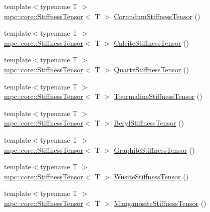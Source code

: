 \begin{DoxyCompactItemize}
\item 
{\footnotesize template$<$typename T $>$ }\\\mbox{\hyperlink{structmpc_1_1core_1_1_stiffness_tensor}{mpc\+::core\+::\+Stiffness\+Tensor}}$<$ T $>$ \mbox{\hyperlink{namespacempc_1_1data_a140a8fa7fc4964a20a6887ba6be7a650}{Corundum\+Stiffness\+Tensor}} ()
\item 
{\footnotesize template$<$typename T $>$ }\\\mbox{\hyperlink{structmpc_1_1core_1_1_stiffness_tensor}{mpc\+::core\+::\+Stiffness\+Tensor}}$<$ T $>$ \mbox{\hyperlink{namespacempc_1_1data_aa3d5b13f695a164174e1cf4b8b074605}{Calcite\+Stiffness\+Tensor}} ()
\item 
{\footnotesize template$<$typename T $>$ }\\\mbox{\hyperlink{structmpc_1_1core_1_1_stiffness_tensor}{mpc\+::core\+::\+Stiffness\+Tensor}}$<$ T $>$ \mbox{\hyperlink{namespacempc_1_1data_ae93bbe5838dc22bf81defc06ed69d05c}{Quartz\+Stiffness\+Tensor}} ()
\item 
{\footnotesize template$<$typename T $>$ }\\\mbox{\hyperlink{structmpc_1_1core_1_1_stiffness_tensor}{mpc\+::core\+::\+Stiffness\+Tensor}}$<$ T $>$ \mbox{\hyperlink{namespacempc_1_1data_aea9a29c1e41fb60d7e2373216a54b90e}{Tourmaline\+Stiffness\+Tensor}} ()
\item 
{\footnotesize template$<$typename T $>$ }\\\mbox{\hyperlink{structmpc_1_1core_1_1_stiffness_tensor}{mpc\+::core\+::\+Stiffness\+Tensor}}$<$ T $>$ \mbox{\hyperlink{namespacempc_1_1data_aacaabd24970e6e0e2d7d3d4f59fc03cf}{Beryl\+Stiffness\+Tensor}} ()
\item 
{\footnotesize template$<$typename T $>$ }\\\mbox{\hyperlink{structmpc_1_1core_1_1_stiffness_tensor}{mpc\+::core\+::\+Stiffness\+Tensor}}$<$ T $>$ \mbox{\hyperlink{namespacempc_1_1data_ab0e3c156b9cf414c6206cf48120790a6}{Graphite\+Stiffness\+Tensor}} ()
\item 
{\footnotesize template$<$typename T $>$ }\\\mbox{\hyperlink{structmpc_1_1core_1_1_stiffness_tensor}{mpc\+::core\+::\+Stiffness\+Tensor}}$<$ T $>$ \mbox{\hyperlink{namespacempc_1_1data_a6600e136fcd24a2952392dc953bd2559}{Wusite\+Stiffness\+Tensor}} ()
\item 
{\footnotesize template$<$typename T $>$ }\\\mbox{\hyperlink{structmpc_1_1core_1_1_stiffness_tensor}{mpc\+::core\+::\+Stiffness\+Tensor}}$<$ T $>$ \mbox{\hyperlink{namespacempc_1_1data_a88b8db86159bab1afa13742374440cb8}{Manganosite\+Stiffness\+Tensor}} ()

\end{DoxyCompactItemize}
